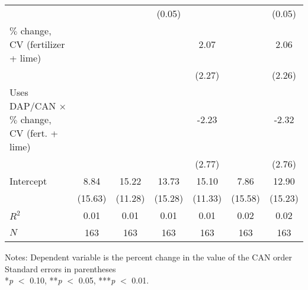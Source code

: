 \begin{table}[htbp]
\begin{threeparttable}
\begin{tabular}{l cccccc}
                    &               &               &      (0.05)   &               &               &      (0.05)   \\
$\%$ change, CV (fertilizer + lime)&               &               &               &        2.07   &               &        2.06   \\
                    &               &               &               &      (2.27)   &               &      (2.26)   \\
Uses DAP/CAN $\times$ $\%$ change, CV (fert. + lime)&               &               &               &       -2.23   &               &       -2.32   \\
                    &               &               &               &      (2.77)   &               &      (2.76)   \\
Intercept           &        8.84   &       15.22   &       13.73   &       15.10   &        7.86   &       12.90   \\
                    &     (15.63)   &     (11.28)   &     (15.28)   &     (11.33)   &     (15.58)   &     (15.23)   \\
\hline
$R^2$               &        0.01   &        0.01   &        0.01   &        0.01   &        0.02   &        0.02   \\
$N$                 &         163   &         163   &         163   &         163   &         163   &         163   \\
\hline
\hline
\end{tabular}
\begin{tablenotes}
\footnotesize
\item{Notes:  Dependent variable is the percent change in the value of the CAN order \\ Standard errors in parentheses \\ *\textit{p} $<$ 0.10, **\textit{p} $<$ 0.05, ***\textit{p} $<$ 0.01.}
\end{tablenotes}
\end{threeparttable}
\end{table}
